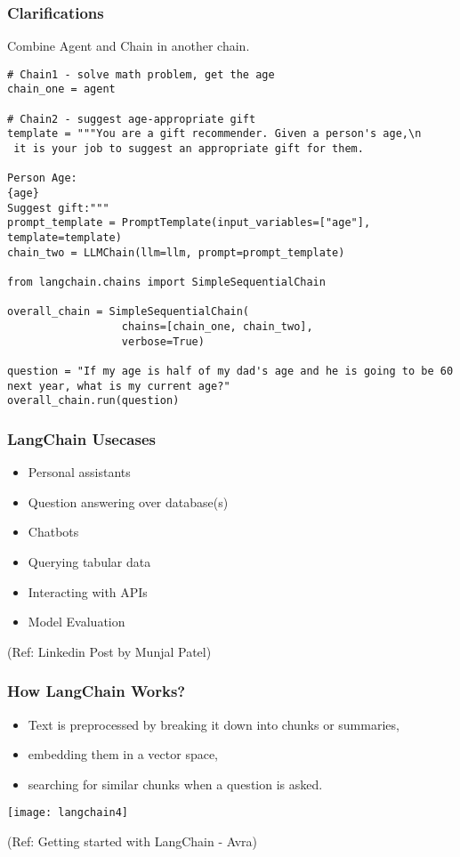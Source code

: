 \begin{frame}[fragile]\frametitle{Clarifications}

Combine Agent and Chain in another chain.

\begin{lstlisting}
# Chain1 - solve math problem, get the age
chain_one = agent

# Chain2 - suggest age-appropriate gift
template = """You are a gift recommender. Given a person's age,\n
 it is your job to suggest an appropriate gift for them.

Person Age:
{age}
Suggest gift:"""
prompt_template = PromptTemplate(input_variables=["age"], template=template)
chain_two = LLMChain(llm=llm, prompt=prompt_template) 

from langchain.chains import SimpleSequentialChain

overall_chain = SimpleSequentialChain(
                  chains=[chain_one, chain_two],
                  verbose=True)
				  
question = "If my age is half of my dad's age and he is going to be 60 next year, what is my current age?"
overall_chain.run(question)				  
\end{lstlisting}

\end{frame}


\begin{frame}\frametitle{LangChain Usecases}

\begin{itemize}
\item Personal assistants
\item Question answering over database(s)
\item Chatbots
\item Querying tabular data
\item Interacting with APIs
\item Model Evaluation
\end{itemize}


{\tiny (Ref: Linkedin Post by Munjal Patel)}
\end{frame}


\begin{frame}\frametitle{How LangChain Works?}

\begin{itemize}
\item Text is preprocessed by breaking it down into chunks or summaries, 
\item embedding them in a vector space, 
\item searching for similar chunks when a question is asked. 
\end{itemize}

\begin{center}
\texttt{[image: langchain4]}
\end{center}	  


{\tiny (Ref: Getting started with LangChain - Avra)}
\end{frame}

